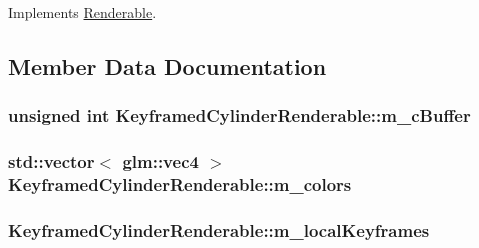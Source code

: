 Implements \hyperlink{classRenderable_a98ab6308c1d2b56dacda7c435fb38d5b}{Renderable}.



\subsection{Member Data Documentation}
\hypertarget{classKeyframedCylinderRenderable_afdf432acba934c57255874373f234875}{
\subsubsection[{m\+\_\+c\+Buffer}]{\setlength{\rightskip}{0pt plus 5cm}unsigned int Keyframed\+Cylinder\+Renderable\+::m\+\_\+c\+Buffer\hspace{0.3cm}{\ttfamily [private]}}}\label{classKeyframedCylinderRenderable_afdf432acba934c57255874373f234875}
\hypertarget{classKeyframedCylinderRenderable_a7e70c2f1e07d14372589ef88f16e7bcd}{
\subsubsection[{m\+\_\+colors}]{\setlength{\rightskip}{0pt plus 5cm}std\+::vector$<$ glm\+::vec4 $>$ Keyframed\+Cylinder\+Renderable\+::m\+\_\+colors\hspace{0.3cm}{\ttfamily [private]}}}\label{classKeyframedCylinderRenderable_a7e70c2f1e07d14372589ef88f16e7bcd}
\hypertarget{classKeyframedCylinderRenderable_a8d821f7953d26700d2eb49ca4b66cc18}{
\subsubsection[{m\+\_\+local\+Keyframes}]{ Keyframed\+Cylinder\+Renderable\+::m\+\_\+local\+Keyframes\hspace{0.3cm}{\ttfamily [private]}}}\label{classKeyframedCylinderRenderable_a8d821f7953d26700d2eb49ca4b66cc18}
